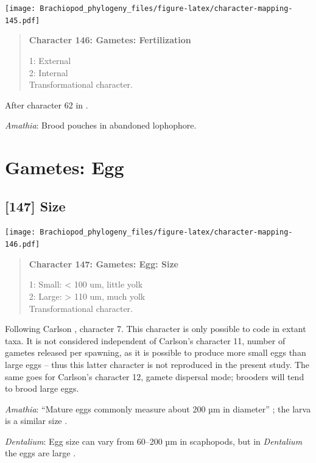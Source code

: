 \documentclass[openany]{book}
\begin{document}
\texttt{[image: Brachiopod\_phylogeny\_files/figure-latex/character-mapping-145.pdf]}

\begin{quote}
\textbf{Character 146: Gametes: Fertilization}

1: External\\
2: Internal\\
Transformational character.
\end{quote}

After character 62 in \citet{Haszprunar2000}.

\hypertarget{Amathia-coding-146}{}
\emph{Amathia}: Brood pouches in abandoned lophophore.

\section{Gametes: Egg}\label{gametes-egg}

\subsection*{{[}147{]} Size}\label{size}

\texttt{[image: Brachiopod\_phylogeny\_files/figure-latex/character-mapping-146.pdf]}

\begin{quote}
\textbf{Character 147: Gametes: Egg: Size}

1: Small: \textless{} 100 um, little yolk\\
2: Large: \textgreater{} 110 um, much yolk\\
Transformational character.
\end{quote}

Following Carlson \citeyearpar{Carlson1995Phylogeneticrelationships},
character 7. This character is only possible to code in extant taxa. It
is not considered independent of Carlson's character 11, number of
gametes released per spawning, as it is possible to produce more small
eggs than large eggs -- thus this latter character is not reproduced in
the present study. The same goes for Carlson's character 12, gamete
dispersal mode; brooders will tend to brood large eggs.

\hypertarget{Amathia-coding-147}{}
\emph{Amathia}: ``Mature eggs commonly measure about 200 µm in
diameter'' \citep{Franzen1977}; the larva is a similar size
\citep{Reed1982}.

\hypertarget{Dentalium-coding-147}{}
\emph{Dentalium}: Egg size can vary from 60--200 µm in scaphopods, but
in \emph{Dentalium} the eggs are large \citep{DufresneDube1983}.
\end{document}
